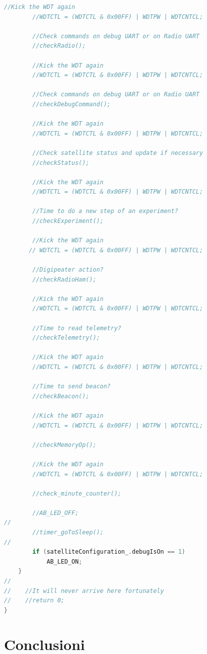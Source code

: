 \documentclass[LaM,binding=0.6cm]{../sapthesis}
\begin{document}
\begin{small}
\begin{lstlisting}[language=C]
        //Kick the WDT again
        //WDTCTL = (WDTCTL & 0x00FF) | WDTPW | WDTCNTCL;

        //Check commands on debug UART or on Radio UART
        //checkRadio();

        //Kick the WDT again
        //WDTCTL = (WDTCTL & 0x00FF) | WDTPW | WDTCNTCL;

        //Check commands on debug UART or on Radio UART
        //checkDebugCommand();

        //Kick the WDT again
        //WDTCTL = (WDTCTL & 0x00FF) | WDTPW | WDTCNTCL;

        //Check satellite status and update if necessary
        //checkStatus();

        //Kick the WDT again
        //WDTCTL = (WDTCTL & 0x00FF) | WDTPW | WDTCNTCL;

        //Time to do a new step of an experiment?
        //checkExperiment();

        //Kick the WDT again
       // WDTCTL = (WDTCTL & 0x00FF) | WDTPW | WDTCNTCL;

        //Digipeater action?
        //checkRadioHam();

        //Kick the WDT again
        //WDTCTL = (WDTCTL & 0x00FF) | WDTPW | WDTCNTCL;

        //Time to read telemetry?
        //checkTelemetry();

        //Kick the WDT again
        //WDTCTL = (WDTCTL & 0x00FF) | WDTPW | WDTCNTCL;

        //Time to send beacon?
        //checkBeacon();

        //Kick the WDT again
        //WDTCTL = (WDTCTL & 0x00FF) | WDTPW | WDTCNTCL;

        //checkMemoryOp();

        //Kick the WDT again
        //WDTCTL = (WDTCTL & 0x00FF) | WDTPW | WDTCNTCL;

        //check_minute_counter();

        //AB_LED_OFF;
//
        //timer_goToSleep();
//
        if (satelliteConfiguration_.debugIsOn == 1)
            AB_LED_ON;
    }
//
//    //It will never arrive here fortunately
//    //return 0;
}
\end{lstlisting}
\end{small}



\chapter{Conclusioni}
\end{document}
